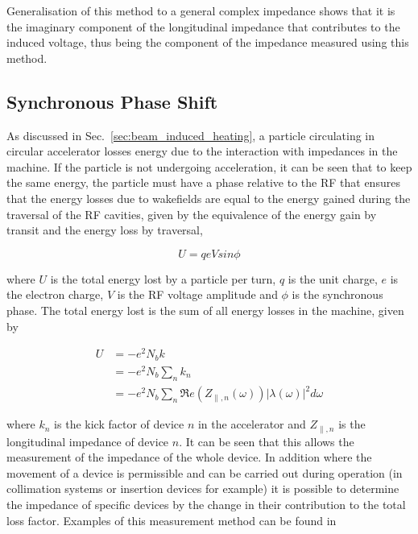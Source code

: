 Generalisation of this method to a general complex impedance shows that it is the imaginary component of the longitudinal impedance that contributes to the induced voltage, thus being the component of the impedance measured using this method.

\subsection{Synchronous Phase Shift}
\label{sec:syn-phase-shift}

As discussed in Sec.~\ref{sec:beam_induced_heating}, a particle circulating in circular accelerator losses energy due to the interaction with impedances in the machine. If the particle is not undergoing acceleration, it can be seen that to keep the same energy, the particle must have a phase relative to the RF that ensures that the energy losses due to wakefields are equal to the energy gained during the traversal of the RF cavities, given by the equivalence of the energy gain by transit and the energy loss by traversal,

\begin{equation}
U = qeVsin\phi
\end{equation}

where $U$ is the total energy lost by a particle per turn, $q$ is the unit charge, $e$ is the electron charge, $V$ is the RF voltage amplitude and $\phi$ is the synchronous phase. The total energy lost is the sum of all energy losses in the machine, given by

\begin{align}
U & = -e^{2}N_{b}k \\
   & = -e^{2}N_{b}\displaystyle\sum\limits_{n} k_{n} \\
   & = -e^{2}N_{b}\displaystyle\sum\limits_{n} \Re{}e\left( Z_{\parallel,n}\left( \omega \right) \right)\left| \lambda \left( \omega \right) \right|^{2} d\omega
\end{align}

where $k_{n}$ is the kick factor of device $n$ in the accelerator and $ Z_{\parallel,n}$ is the longitudinal impedance of device $n$. It can be seen that this allows the measurement of the impedance of the whole device. In addition where the movement of a device is permissible and can be carried out during operation (in collimation systems or insertion devices for example) it is possible to determine the impedance of specific devices by the change in their contribution to the total loss factor. Examples of this measurement method can be found in \cite{Bohl:SingleBunchEnLoss, Argyropoulos:longImpInj}

